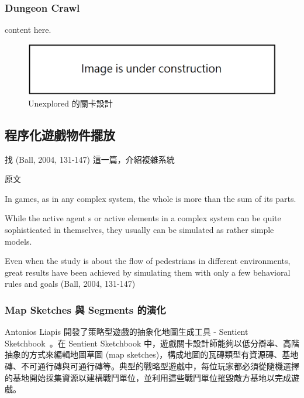 \subsubsection{Dungeon Crawl}
\label{sssec:relatedworks-proceduralmission-dungeoncrawl}

content here.

\begin{figure}[ht]
  \begin{center}
    \includegraphics[width=1.0\textwidth]{figures/under_construction.png}
    \caption{Unexplored 的關卡設計} 
    \label{fig:unexplored}
  \end{center}
\end{figure}

\subsection{程序化遊戲物件擺放}
\label{ssec:relatedworks-proceduralgamepatterns}

找  (Ball, 2004, 131-147) 這一篇，介紹複雜系統

原文

In games, as in any complex system, the whole is more than the sum of its parts.  

While the active agent s or active elements in a complex system can be quite sophisticated in themselves, they usually can be simulated as rather simple models. 

Even when the study is about the flow of pedestrians in different environments, great results have been achieved by simulating them with only a few behavioral rules and goals (Ball, 2004, 131-147)


\subsubsection{Map Sketches 與 Segments 的演化}
\label{sssec:relatedworks-proceduralgamepatterns-mapsketches}

Antonios Liapis 開發了策略型遊戲的抽象化地圖生成工具 - Sentient Sketchbook~\cite{liapis2013generating}。在 Sentient Sketchbook 中，遊戲關卡設計師能夠以低分辯率、高階抽象的方式來編輯地圖草圖 (map sketches)，構成地圖的瓦磚類型有資源磚、基地磚、不可通行磚與可通行磚等。典型的戰略型遊戲中，每位玩家都必須從隨機選擇的基地開始採集資源以建構戰鬥單位，並利用這些戰鬥單位摧毀敵方基地以完成遊戲。

